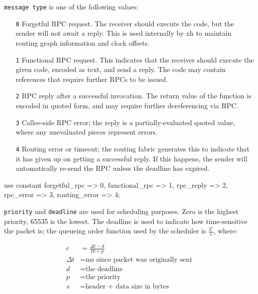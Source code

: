 \documentclass{report}
\begin{document}
    {\tt message type} is one of the following values:

\begin{enumerate}
\item[\tt 0]
  Forgetful RPC request. The receiver should execute the code, but the
  sender will not await a reply. This is used internally by xh to
  maintain routing graph information and clock offsets.

\item[\tt 1]
  Functional RPC request. This indicates that the receiver should execute
  the given code, encoded as text, and send a reply. The code may contain
  references that require further RPCs to be issued.

\item[\tt 2]
  RPC reply after a successful invocation. The return value of the
  function is encoded in quoted form, and may require further
  dereferencing via RPC.

\item[\tt 3]
  Callee-side RPC error; the reply is a partially-evaluated quoted value,
  where any unevaluated pieces represent errors.

\item[\tt 4]
  Routing error or timeout; the routing fabric generates this to indicate
  that it has given up on getting a successful reply. If this happens,
  the sender will automatically re-send the RPC unless the deadline has
  expired.
\end{enumerate}

\begin{perlcode}
use constant {forgetful_rpc  => 0,
              functional_rpc => 1,
              rpc_reply      => 2,
              rpc_error      => 3,
              routing_error  => 4}; \end{perlcode}

    {\tt priority} and {\tt deadline} are used for scheduling purposes. Zero is
    the highest priority, 65535 is the lowest. The deadline is used to indicate
    how time-sensitive the packet is; the queueing order function used by the
    scheduler is $\frac{2^c}{s}$, where:

\begin{align*}
c & = \frac{\Delta t - d}{16 + p} \\
\Delta t & = \textrm{ms since packet was originally sent} \\
d & = \textrm{the deadline} \\
p & = \textrm{the priority} \\
s & = \textrm{header + data size in bytes}
\end{align*}
\end{document}
